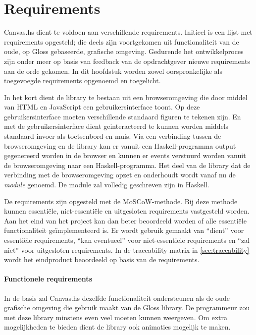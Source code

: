 \chapter{Requirements} \label{hoofdstuk:requirements}
Canvas.hs dient te voldoen aan verschillende requirements. Initieel is een lijst met requirements opgesteld; die deels zijn voortgekomen uit functionaliteit van de oude, op Gloss gebaseerde, grafische omgeving. Gedurende het ontwikkelproces zijn onder meer op basis van feedback van de opdrachtgever nieuwe requirements aan de orde gekomen. In dit hoofdstuk worden zowel oorspronkelijke als toegevoegde requirements opgenoemd en toegelicht.

In het kort dient de library te bestaan uit een browseromgeving die door middel van HTML en JavaScript een gebruikersinterface toont. Op deze gebruikersinterface moeten verschillende standaard figuren te tekenen zijn. En met de gebruikersinterface dient geinteracteerd te kunnen worden middels standaard invoer als toetsenbord en muis. Via een verbinding tussen de browseromgeving en de library kan er vanuit een Haskell-programma output gegenereerd worden in de browser en kunnen er events verstuurd worden vanuit de browseromgeving naar een Haskell-programma. Het deel van de library dat de verbinding met de browseromgeving opzet en onderhoudt wordt vanaf nu de \emph{module} genoemd. De module zal volledig geschreven zijn in Haskell.

De requirements zijn opgesteld met de MoSCoW-methode. Bij deze methode kunnen essenti\"ele, niet-essenti\"ele en uitgesloten requirements vastgesteld worden. Aan het eind van het project kan dan beter beoordeeld worden of alle essenti\"ele functionaliteit ge\"implementeerd is. Er wordt gebruik gemaakt van ``dient'' voor essenti\"ele requirements, ``kan eventueel'' voor niet-essentiele requirements en ``zal niet'' voor uitgesloten requirements. In de traceability matrix in \autoref{sec:traceability} wordt het eindproduct beoordeeld op basis van de requirements.

\subsubsection{Functionele requirements}
In de basis zal Canvas.hs dezelfde functionaliteit ondersteunen als de oude grafische omgeving die gebruik maakt van de Gloss library. De programmeur zou met deze library minstens even veel moeten kunnen weergeven. Om extra mogelijkheden te bieden dient de library ook animaties mogelijk te maken.

